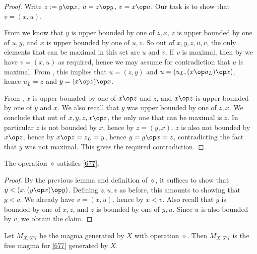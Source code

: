 \begin{proof} Write $z := y \op x$, $u = z \op y$, $v = x \op u$.  Our task is to show that $v = (x,u)$.

From  we know that $y$ is upper bounded by one of $z,x$, $z$ is upper bounded by one of $u,y$, and $x$ is upper bounded by one of $u,v$.  So out of $x,y,z,u,v$, the only elements that can be maximal in this set are $u$ and $v$.  If $v$ is maximal, then by  we have $v = (x,u)$ as required, hence we may assume for contradiction that $u$ is maximal.  From , this implies that $u = (z,y)$ and $u = (u_L, (x \op u_L) \op x)$, hence $u_L = z$ and $y = (x \op z) \op x$.

From , $x$ is upper bounded by one of $x \op z$ and $z$, and $x \op z$ is upper bounded by one of $y$ and $x$.  We also recall that $y$ was upper bounded by one of $z,x$. We conclude that out of $x,y,z,x \op z$, the only one that can be maximal is $z$.  In particular $z$ is not bounded by $x$, hence by  $z = (y,x)$.  $z$ is also not bounded by $x \op z$, hence by  $x \op z = z_L = y$, hence $y = y \op x = z$, contradicting the fact that $y$ was not maximal. This gives the required contradiction.
\end{proof}

\begin{corollary}\label{677-satisfy}  The operation $\diamond$ satisfies \eqref{677}.
\end{corollary}

\begin{proof} By the previous lemma and definition of $\diamond$, it suffices to show that $y < (x, (y \op x) \op y)$.  Defining $z,u,v$ as before, this amounts to showing that $y < v$.  We already have $v = (x,u)$, hence by  $x < v$.  Also recall that $y$ is bounded by one of $x,z$, and $z$ is bounded by one of $y,u$.  Since $u$ is also bounded by $v$, we obtain the claim.
\end{proof}

\begin{corollary} Let $M_{X,677}$ be the magma generated by $X$ with operation $\diamond$.  Then $M_{X,677}$ is the free magma for \eqref{677} generated by $X$.
\end{corollary}


